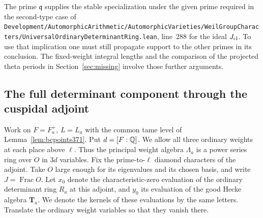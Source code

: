 \documentclass[a4paper,11pt]{article}
\theoremstyle{definition}
\theoremstyle{remark}
\newcommand{\srcloc}[2]{{\small\nolinkurl{#1.lean}}, line~#2}
\numberwithin{equation}{section}
\begin{document}
The prime \(\mathfrak q\) supplies the stable specialization
under the given prime required in the second-type case of
\srcloc{Development/AutomorphicArithmetic/AutomorphicVarieties/WeilGroupCharacters/UniversalOrdinaryDeterminantRing}{288}
for the ideal \(J_{\rm cl}\). To use that implication one
must still propagate support to the other primes in its
conclusion. The fixed-weight integral lengths and the
comparison of the projected theta periods in
Section~\ref{sec:missing} involve those further arguments.


\subsection{The full determinant component through the cuspidal adjoint}
\label{sec:adjcomponent372}

Work on \(F=F_a^+\), \(L=L_a\) with the common tame level
of Lemma~\ref{lem:bcpoints371}. Put \(d=[F:\mathbb Q]\). We allow
all three ordinary weights at each place above \(\ell\).
Thus the principal weight algebra \(\Lambda_a\) is a power
series ring over \(O\) in \(3d\) variables. Fix the
prime-to-\(\ell\) diamond characters of the adjoint. Take
\(O\) large enough for its eigenvalues and its chosen basis,
and write \(J=\operatorname{Frac}O\). Let \(x_0\) denote the
characteristic-zero evaluation of the ordinary determinant
ring \(R_a\) at this adjoint, and \(y_0\) its evaluation of
the good Hecke algebra \(\mathbf T_a\). We denote the kernels
of these evaluations by the same letters. Translate the
ordinary weight variables so that they vanish there.
\end{document}

